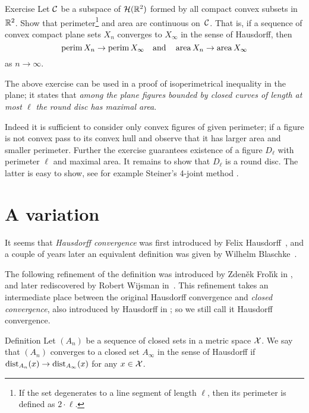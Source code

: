 \begin{thm}{Exercise}\label{ex:Huas-perimeter-area}
Let $\mathcal{C}$ be a subspace of $\mathcal{H}(\mathbb{R}^2)$ formed by all compact convex subsets in $\mathbb{R}^2$.
Show that perimeter\footnote{If the set degenerates to a line segment of length $\ell$, then its perimeter is defined as $2\cdot \ell$.} and area are continuous on~$\mathcal{C}$.
That is, if a sequence of convex compact plane sets $X_n$ converges to $X_\infty$ in the sense of Hausdorff, then 
\[\operatorname{\rm perim}\nolimits X_n\to \operatorname{\rm perim}\nolimits X_\infty\quad\text{and}\quad\operatorname{\rm area}\nolimits X_n\to\operatorname{\rm area}\nolimits X_\infty\]
as $n\to\infty$.
\end{thm}

The above exercise can be used in a proof of isoperimetrical inequality in the plane;
it states that \emph{among the plane figures bounded by closed curves of length at most $\ell$ the round disc has maximal area}.

Indeed it is sufficient to consider only convex figures of given perimeter; if a figure is not convex pass to its convex hull and observe that it has larger area and smaller perimeter.
Further the exercise guarantees existence of a figure $D_\ell$ with perimeter $\ell$ and maximal area.
It remains to show that $D_\ell$ is a round disc.
The latter is easy to show, see for example Steiner's 4-joint method \cite{blaschke}.


\section{A variation}\label{sec:H-variation}

It seems that \emph{Hausdorff convergence} was first introduced by Felix Hausdorff~\cite{hausdorff},
and a couple of years later an equivalent definition was given by Wilhelm Blaschke~\cite{blaschke}.

The following refinement of the definition was introduced by  Zden\v{e}k Frol\'{\i}k in \cite{frolik},
and later rediscovered by Robert Wijsman in~\cite{wijsman}.  
This refinement takes an intermediate place between the original Hausdorff convergence and {}\emph{closed convergence}, also introduced by Hausdorff in \cite{hausdorff};
so we still call it Hausdorff convergence.

\begin{thm}{Definition}\label{def:gen-Haus-conv}
Let $(A_n)$ be a sequence of closed sets in a metric space $\mathcal{X}$.
We say that $(A_n)$ converges to a closed set $A_\infty$ in the sense of Hausdorff if $\mathrm{dist}_{A_n}(x)\to \mathrm{dist}_{A_\infty}(x)$ for any $x\in\mathcal{X}$.
\end{thm}


